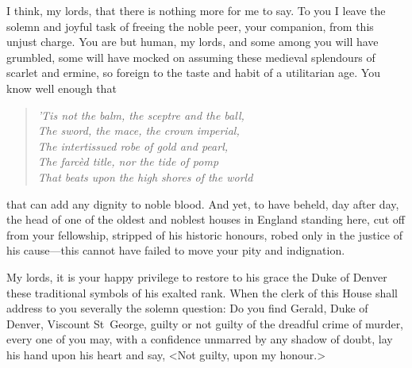 \begin{dialogue}
I think, my lords, that there is nothing more for me to say. To you I leave the solemn and joyful task of freeing the noble peer, your companion, from this unjust charge. You are but human, my lords, and some among you will have grumbled, some will have mocked on assuming these medieval splendours of scarlet and ermine, so foreign to the taste and habit of a utilitarian age. You know well enough that

\begin{quote}\itshape
'Tis not the balm, the sceptre and the ball,\\
The sword, the mace, the crown imperial,\\
The intertissued robe of gold and pearl,\\
The farcèd title, nor the tide of pomp\\
That beats upon the high shores of the world\\
\end{quote}

that can add any dignity to noble blood. And yet, to have beheld, day after day, the head of one of the oldest and noblest houses in England standing here, cut off from your fellowship, stripped of his historic honours, robed only in the justice of his cause—this cannot have failed to move your pity and indignation.



My lords, it is your happy privilege to restore to his grace the Duke of Denver these traditional symbols of his exalted rank. When the clerk of this House shall address to you severally the solemn question: Do you find Gerald, Duke of Denver, Viscount St~George, guilty or not guilty of the dreadful crime of murder, every one of you may, with a confidence unmarred by any shadow of doubt, lay his hand upon his heart and say, <Not guilty, upon my honour.>

\end{dialogue}
